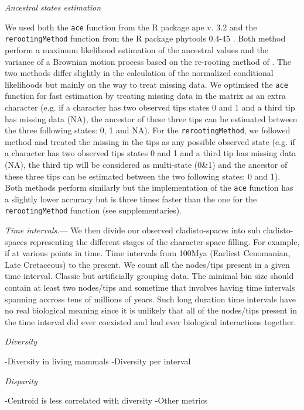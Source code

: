 \documentclass[12pt,letterpaper]{article}
\renewcommand{\subsection}[1]{%
\bigskip
\begin{center}
\begin{large}
\normalfont\itshape #1
\end{large}
\end{center}}
\renewcommand{\subsubsection}[1]{%
\vspace{2ex}
\noindent
\textit{#1.}---}
\begin{document}
\subsection{Ancestral states estimation}
We used both the \texttt{ace} function from the R package ape v. 3.2 \cite{paradisape:2004} and the 
\texttt{rerootingMethod} function from the R package phytools 0.4-45 \cite{phytools}. Both method perform a maximum likelihood estimation of the ancestral values and the variance of a Brownian motion process based on the re-rooting method of \cite{Yang01121995}. The two methods differ slightly in the calculation of the normalized conditional likelihoods but mainly on the way to treat missing data. We optimised the \texttt{ace} function for fast estimation by treating missing data in the matrix as an extra character (e.g. if a character has two observed tips states 0 and 1 and a third tip has missing data (NA), the ancestor of these three tips can be estimated between the three following states: 0, 1 and NA). For the \texttt{rerootingMethod}, we followed \cite{Claddis} method and treated the missing in the tips as any possible observed state (e.g. if a character has two observed tips states 0 and 1 and a third tip has missing data (NA), the third tip will be considered as multi-state (0\&1) and the ancestor of these three tips can be estimated between the two following states: 0 and 1). Both methods perform similarly but the implementation of the \texttt{ace} function has a slightly lower accuracy  but is three times faster than the one for the \texttt{rerootingMethod} function (see supplementaries).

\subsubsection{Time intervals}
We then divide our observed cladisto-spaces into sub cladisto-spaces representing the different stages of the character-space filling. For example, if at various points in time.
Time intervals from 100Mya (Earliest Cenomanian, Late Cretaceous) to the present.
We count all the nodes/tips present in a given time interval.
Classic but artificially grouping data. The minimal bin size should contain at least two nodes/tips and sometime that involves having time intervals spanning accross tens of millions of years. Such long duration time intervals have no real biological meaning since it is unlikely that all of the nodes/tips present in the time interval did ever coexisted and had ever biological interactions together.

\subsection{Diversity}
-Diversity in living mammals
-Diversity per interval

\subsection{Disparity}
-Centroid is less correlated with diversity
-Other metrics
\end{document}
